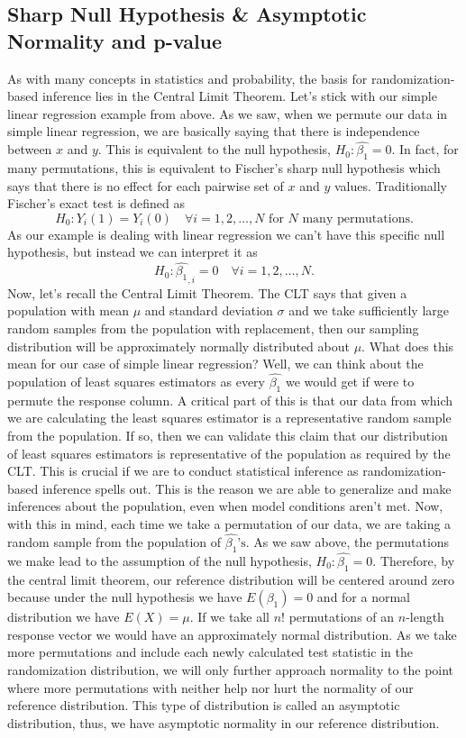 \subsection{Sharp Null Hypothesis \& Asymptotic Normality and p-value}

As with many concepts in statistics and probability, the basis for randomization-based inference lies in the Central Limit Theorem. Let's stick with our simple linear regression example from above. As we saw, when we permute our data in simple linear regression, we are basically saying that there is independence between $x$ and $y$. This is equivalent to the null hypothesis, $H_0:\hat{\beta_1}=0$. In fact, for many permutations, this is equivalent to Fischer's sharp null hypothesis which says that there is no effect for each pairwise set of $x$ and $y$ values. Traditionally Fischer's exact test is defined as 
$$H_0:Y_i(1)=Y_i(0)\quad\forall i=1,2,\dots,N \text{ for } N \text{ many permutations.}$$ As our example is dealing with linear regression we can't have this specific null hypothesis, but instead we can interpret it as $$H_0:\hat{\beta_1}_{,i}=0\quad\forall i = 1,2,\dots,N.$$ Now, let's recall the Central Limit Theorem. The CLT says that given a population with mean $\mu$ and standard deviation $\sigma$ and we take sufficiently large random samples from the population with replacement, then our sampling distribution will be approximately normally distributed about $\mu$. What does this mean for our case of simple linear regression? Well, we can think about the population of least squares estimators as every $\hat{\beta_1}$ we would get if were to permute the response column. A critical part of this is that our data from which we are calculating the least squares estimator is a representative random sample from the population. If so, then we can validate this claim that our distribution of least squares estimators is representative of the population as required by the CLT. This is crucial if we are to conduct statistical inference as randomization-based inference spells out. This is the reason we are able to generalize and make inferences about the population, even when model conditions aren't met. Now, with this in mind, each time we take a permutation of our data, we are taking a random sample from the population of $\hat{\beta_1}\text{'s}$. As we saw above, the permutations we make lead to the assumption of the null hypothesis, $H_0:\hat{\beta_1}=0$. Therefore, by the central limit theorem, our reference distribution will be centered around zero because under the null hypothesis we have $E(\beta_1)=0$ and for a normal distribution we have $E(X)=\mu$. If we take all $n!$ permutations of an $n$-length response vector we would have an approximately normal distribution. As we take more permutations and include each newly calculated test statistic in the randomization distribution, we will only further approach normality to the point where more permutations with neither help nor hurt the normality of our reference distribution. This type of distribution is called an asymptotic distribution, thus, we have asymptotic normality in our reference distribution.
